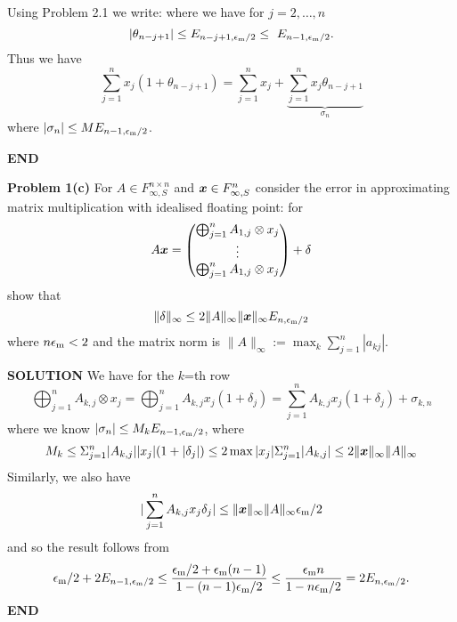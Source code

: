 \documentclass[12pt,a4paper]{article}
\def\x{ {\vc x} }
\begin{document}
Using Problem 2.1 we write:
where we have for $j = 2,\ensuremath{\ldots},n$
\[
|\ensuremath{\theta}_{n-j+1}| \ensuremath{\leq} E_{n-j+1,\ensuremath{\epsilon}_{\rm m}/2} \ensuremath{\leq} E_{n-1,\ensuremath{\epsilon}_{\rm m}/2}.
\]
Thus we have 
\[
\ensuremath{\sum}_{j=1}^n x_j (1 + \ensuremath{\theta}_{n-j+1})= \ensuremath{\sum}_{j=1}^n x_j + \underbrace{\ensuremath{\sum}_{j=1}^n x_j \ensuremath{\theta}_{n-j+1}}_{\ensuremath{\sigma}_n}
\]
where $|\ensuremath{\sigma}_n| \ensuremath{\leq} M E_{n-1,\ensuremath{\epsilon}_{\rm m}/2}$.

\textbf{END}

\textbf{Problem 1(c)} For $A \ensuremath{\in} F_{\ensuremath{\infty},S}^{n \ensuremath{\times} n}$ and $\ensuremath{\bm{\x}} \ensuremath{\in} F_{\ensuremath{\infty},S}^n$ consider the error in approximating matrix multiplication with idealised floating point: for
\[
A \ensuremath{\bm{\x}} =  \begin{pmatrix}
\ensuremath{\bigoplus}_{j=1}^n A_{1,j} \ensuremath{\otimes} x_j\\
\ensuremath{\vdots} \\
\ensuremath{\bigoplus}_{j=1}^n A_{1,j} \ensuremath{\otimes} x_j
\end{pmatrix} + \ensuremath{\delta}
\]
show that
\[
\| \ensuremath{\delta} \|_\ensuremath{\infty} \ensuremath{\leq} 2 \|A\|_\ensuremath{\infty} \| \ensuremath{\bm{\x}} \|_\ensuremath{\infty} E_{n,\ensuremath{\epsilon}_{\rm m}/2}
\]
where  $n \ensuremath{\epsilon}_{\rm m} < 2$ and the matrix norm is $\|A \|_\ensuremath{\infty} := \max_k \ensuremath{\sum}_{j=1}^n |a_{kj}|$.

\textbf{SOLUTION} We have for the $k$=th row
\[
\ensuremath{\bigoplus}_{j=1}^n A_{k,j} \ensuremath{\otimes} x_j =  \ensuremath{\bigoplus}_{j=1}^n A_{k,j} x_j (1+\ensuremath{\delta}_j) = 
\ensuremath{\sum}_{j=1}^n A_{k,j} x_j (1+\ensuremath{\delta}_j) + \ensuremath{\sigma}_{k,n}
\]
where we know $|\ensuremath{\sigma}_n| \ensuremath{\leq} M_k E_{n-1,\ensuremath{\epsilon}_{\rm m}/2}$, where
\[
M_k \ensuremath{\leq} \ensuremath{\Sigma}_{j=1}^n |A_{k,j}| |x_j| (1+|\ensuremath{\delta}_j|)  \ensuremath{\leq} 2 \max |x_j| \ensuremath{\Sigma}_{j=1}^n |A_{k,j}|
\ensuremath{\leq} 2 \|\ensuremath{\bm{\x}}\|_\ensuremath{\infty} \|A \|_\ensuremath{\infty}
\]
Similarly, we also have 
\[
|\ensuremath{\sum}_{j=1}^n A_{k,j} x_j \ensuremath{\delta}_j| \ensuremath{\leq} \|\ensuremath{\bm{\x}}\|_\ensuremath{\infty} \|A \|_\ensuremath{\infty} \ensuremath{\epsilon}_{\rm m}/2
\]
and so the result follows from
\[
\ensuremath{\epsilon}_{\rm m}/2 + 2E_{n-1,\ensuremath{\epsilon}_{\rm m}/2} \ensuremath{\leq} {\ensuremath{\epsilon}_{\rm m}/2 + \ensuremath{\epsilon}_{\rm m} (n-1) \over 1-(n-1)\ensuremath{\epsilon}_{\rm m}/2} \ensuremath{\leq} {\ensuremath{\epsilon}_{\rm m} n \over 1-n\ensuremath{\epsilon}_{\rm m}/2} = 2E_{n,\ensuremath{\epsilon}_{\rm m}/2}.
\]
\textbf{END}
\end{document}
